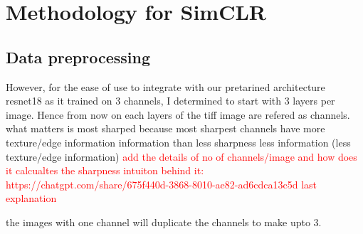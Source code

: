 \chapter{Methodology for SimCLR}\label{ch: Methodology for SimCLR}

\section{Data preprocessing} \label{sec:data preprocessing}

However, for the ease of use to integrate with our pretarined architecture resnet18 as it trained on 3 channels,
I determined to start with 3 layers per image. Hence from now on each layers of the tiff image are refered as channels.
what matters is  most sharped because 
most sharpest channels have more texture/edge information information than less sharpness 
less information (less texture/edge information) 
\textcolor{red}{add the details of no of channels/image and how does it calcualtes the sharpness intuiton behind
it: https://chatgpt.com/share/675f440d-3868-8010-ae82-ad6cdca13c5d last explanation}

the images with one channel will duplicate the channels to make upto 3.

